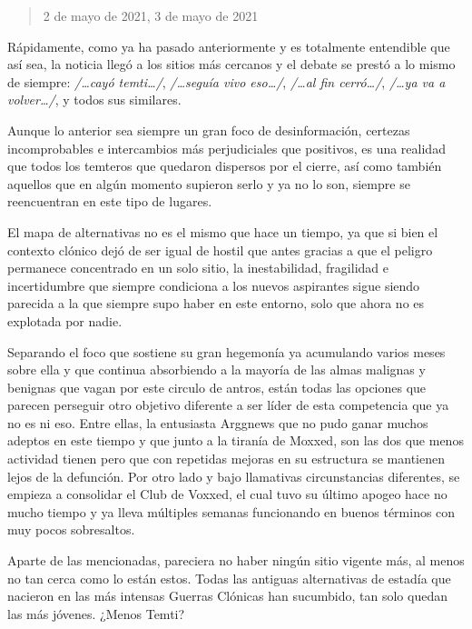 \documentclass[
  spanish,
]{book}
\begin{document}
\begin{quote}
2 de mayo de 2021, 3 de mayo de 2021
\end{quote}

Rápidamente, como ya ha pasado anteriormente y es totalmente entendible que así sea, la noticia llegó a los sitios más cercanos y el debate se prestó a lo mismo de siempre: \emph{/\ldots cayó temti\ldots/}, \emph{/\ldots seguía vivo eso\ldots/}, \emph{/\ldots al fin cerró\ldots/}, \emph{/\ldots ya va a volver\ldots/}, y todos sus similares.

Aunque lo anterior sea siempre un gran foco de desinformación, certezas incomprobables e intercambios más perjudiciales que positivos, es una realidad que todos los temteros que quedaron dispersos por el cierre, así como también aquellos que en algún momento supieron serlo y ya no lo son, siempre se reencuentran en este tipo de lugares.

El mapa de alternativas no es el mismo que hace un tiempo, ya que si bien el contexto clónico dejó de ser igual de hostil que antes gracias a que el peligro permanece concentrado en un solo sitio, la inestabilidad, fragilidad e incertidumbre que siempre condiciona a los nuevos aspirantes sigue siendo parecida a la que siempre supo haber en este entorno, solo que ahora no es explotada por nadie.

Separando el foco que sostiene su gran hegemonía ya acumulando varios meses sobre ella y que continua absorbiendo a la mayoría de las almas malignas y benignas que vagan por este circulo de antros, están todas las opciones que parecen perseguir otro objetivo diferente a ser líder de esta competencia que ya no es ni eso. Entre ellas, la entusiasta Arggnews que no pudo ganar muchos adeptos en este tiempo y que junto a la tiranía de Moxxed, son las dos que menos actividad tienen pero que con repetidas mejoras en su estructura se mantienen lejos de la defunción. Por otro lado y bajo llamativas circunstancias diferentes, se empieza a consolidar el Club de Voxxed, el cual tuvo su último apogeo hace no mucho tiempo y ya lleva múltiples semanas funcionando en buenos términos con muy pocos sobresaltos.

Aparte de las mencionadas, pareciera no haber ningún sitio vigente más, al menos no tan cerca como lo están estos. Todas las antiguas alternativas de estadía que nacieron en las más intensas Guerras Clónicas han sucumbido, tan solo quedan las más jóvenes. ¿Menos Temti?
\end{document}
